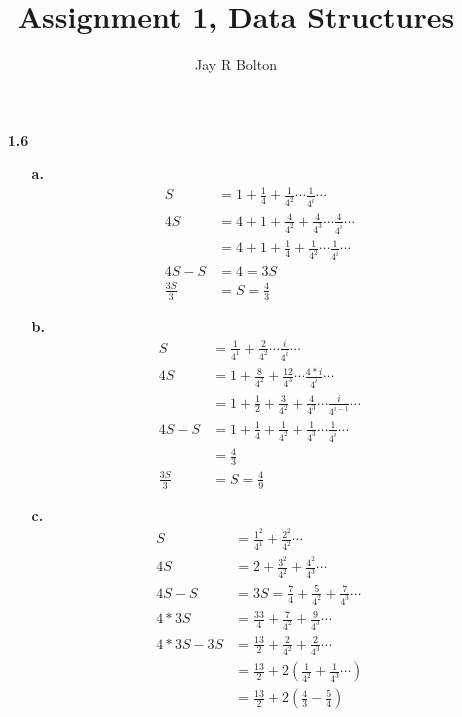 \documentclass{article}
\title{Assignment 1, Data Structures}
\author{Jay R Bolton}
\begin{document}
\maketitle

\begin{enumerate}

\item[\textbf{1.6}]
 \begin{enumerate}
  \item[\textbf{a.}]
   \begin{align}
    S &= 1 + \frac{1}{4} + \frac{1}{4^2} \cdots \frac{1}{4^i} \cdots \\
    4S &= 4 + 1 + \frac{4}{4^2} + \frac{4}{4^3} \cdots \frac{4}{4^i} \cdots \\
    &= 4 + 1 + \frac{1}{4} + \frac{1}{4^2}  \cdots \frac{1}{4^i} \cdots \\
    4S - S &=  4 = 3S \\
    \frac{3S}{3} &= S = \frac{4}{3}
   \end{align}
  \item[\textbf{b.}]
   \begin{align}
    S &= \frac{1}{4^1} + \frac{2}{4^2} \cdots \frac{i}{4^i} \cdots \\
    4S &= 1 + \frac{8}{4^2} + \frac{12}{4^3} \cdots \frac{4*i}{4^i} \cdots \\
    &= 1 + \frac{1}{2} + \frac{3}{4^2} + \frac{4}{4^3} \cdots \frac{i}{4^{i-1}} \cdots \\
    4S - S &= 1 + \frac{1}{4} + \frac{1}{4^2} + \frac{1}{4^3} \cdots \frac{1}{4^i} \cdots \\
    &= \frac{4}{3} \\
    \frac{3S}{3} &= S = \frac{4}{9}
   \end{align}
  \item[\textbf{c.}]
   \begin{align}
    S &= \frac{1^2}{4^1} + \frac{2^2}{4^2} \cdots \\
    4S &= 2 + \frac{3^2}{4^2} + \frac{4^2}{4^3} \cdots \\
    4S - S &= 3S = \frac{7}{4} + \frac{5}{4^2} + \frac{7}{4^3} \cdots\\
    4*3S &= \frac{33}{4} + \frac{7}{4^2} + \frac{9}{4^3} \cdots \\
    4*3S - 3S &= \frac{13}{2} + \frac{2}{4^2} + \frac{2}{4^3} \cdots \\
              &= \frac{13}{2} + 2(\frac{1}{4^2} + \frac{1}{4^3}\cdots) \\
              &= \frac{13}{2} + 2(\frac{4}{3} - \frac{5}{4}) \\

\end{align}
\end{enumerate}
\end{enumerate}
\end{document}
